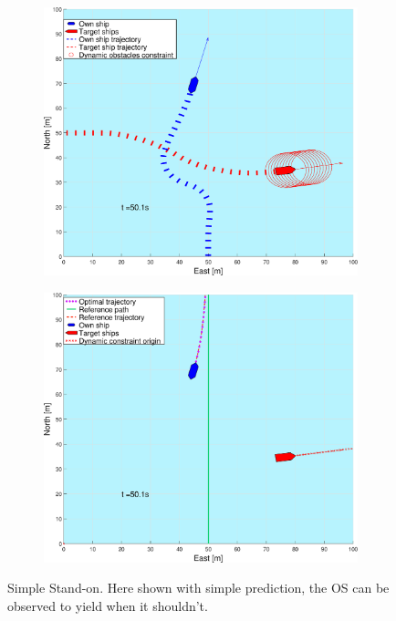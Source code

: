 \begin{figure}[ht!]
\begin{subfigure}[b]{0.499\textwidth}
        \subcaption{}
    \end{subfigure}
    \hfill
    \\
    \begin{subfigure}[b]{0.49\textwidth}
        \centering
        \includegraphics[width=\textwidth]{Images/Figures/enkel_SO/_Simple_1fig1_time=50}
        \subcaption{}
    \end{subfigure}
    \hfill
    \begin{subfigure}[b]{0.499\textwidth}
        \centering
        \includegraphics[width=\textwidth]{Images/Figures/enkel_SO/_Simple_1fig999_time=50}
        \subcaption{}
    \end{subfigure}
    \hfill
    \caption{Simple Stand-on. Here shown with simple prediction, the \gls{OS} can be observed to yield when it shouldn't.}
    \label{FIG: Simple SO simple pred}
\end{figure}%
